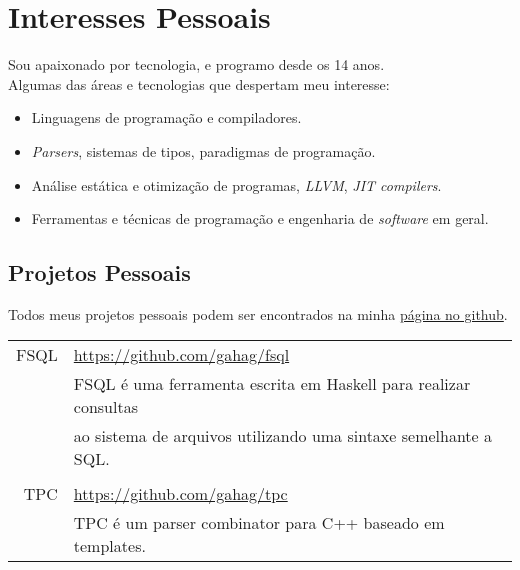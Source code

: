 \documentclass[a4paper,10pt]{article}
\renewcommand\#{\protect\scalebox{0.8}{\protect\raisebox{0.4ex}{\char"0023}}}
\begin{document}
\section{Interesses Pessoais}
Sou apaixonado por tecnologia, e programo desde os 14 anos. \\
Algumas das áreas e tecnologias que despertam meu interesse:
\vspace{-3pt}
\begin{itemize}
  \setlength\itemsep{-3pt}
  \item Linguagens de programação e compiladores.
  \item \emph{Parsers}, sistemas de tipos, paradigmas de programação.
  \item Análise estática e otimização de programas, \emph{LLVM}, \emph{JIT compilers}.
  \item Ferramentas e técnicas de programação e engenharia de \emph{software} em geral.
\end{itemize}

\subsection{Projetos Pessoais}
Todos meus projetos pessoais podem ser encontrados na minha \href{https://github.com/gahag/}{página no github}. \\[10pt]
\begin{tabular}{r|l}
  \textsc{FSQL} & \url{https://github.com/gahag/fsql} \\[3pt]
  & FSQL é uma ferramenta escrita em Haskell para realizar consultas \\
  & ao sistema de arquivos utilizando uma sintaxe semelhante a SQL. \\
  
  \multicolumn{2}{c}{} \\
  \textsc{TPC} & \url{https://github.com/gahag/tpc} \\[3pt]
  & TPC é um parser combinator para C++ baseado em templates. \\
\end{tabular}
\end{document}

